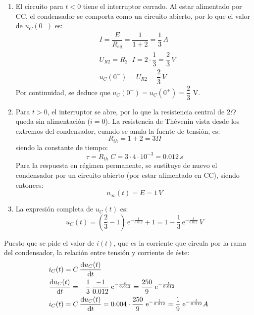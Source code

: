 \begin{enumerate}
    \item El circuito para $t<0$ tiene el interruptor cerrado. Al estar alimentado por CC, el condensador se comporta como un circuito abierto, por lo que el valor de $u_C(0^-)$ es:
    \begin{align*}
        &I=\dfrac{E}{R_{eq}}=\dfrac{1}{1+2}=\dfrac{1}{3}\,A\\
        &U_{R2}=R_2\cdot I=2\cdot\dfrac{1}{3}=\dfrac{2}{3}\,V\\
        &u_C(0^-)=U_{R2}=\dfrac{2}{3}\,V
    \end{align*}
    Por continuidad, se deduce que $u_C(0^-)=u_C(0^+)=\dfrac{2}{3}$ V.
    \item Para $t>0$, el interruptor se abre, por lo que la resistencia central de $2\Omega$ queda sin alimentación ($i=0$). La resistencia de Thévenin vista desde los extremos del condensador, cuando se anula la fuente de tensión, es:
    \begin{equation*}
        R_{th}=1+2=3\Omega
    \end{equation*}
    siendo la constante de tiempo:
    \begin{equation*}
        \tau=R_{th}\;C=3\cdot4\cdot10^{-3}=0.012\,s
    \end{equation*}
    Para la respuesta en régimen permanente, se sustituye de nuevo el condensador por un circuito abierto (por estar alimentado en CC), siendo entonces:
    \begin{equation*}
        u_\infty(t)=E=1\,V
    \end{equation*}
    \item La expresión completa de $u_C(t)$ es:
    \begin{equation*}
        u_C(t)=\left(\dfrac{2}{3}-1 \right)\,\mathrm{e}^{-\frac{t}{0.012}}+1=1-\dfrac{1}{3}\,\mathrm{e}^{-\frac{t}{0.012}}\,V
    \end{equation*}
\end{enumerate}
Puesto que se pide el valor de $i(t)$, que es la corriente que circula por la rama del condensador, la relación entre tensión y corriente de éste:
\begin{align*}
    &i_C(t)=C\,\diff{u_C(t)}{t}\\
    &\diff{u_C(t)}{t}=-\dfrac{1}{3}\,\dfrac{-1}{0.012}\; \mathrm{e}^{-\frac{t}{0.012}}=\dfrac{250}{9}\; \mathrm{e}^{-\frac{t}{0.012}}\\
    & i_C(t)=C\,\diff{u_C(t)}{t}=0.004\cdot \dfrac{250}{9}\; \mathrm{e}^{-\frac{t}{0.012}}=\dfrac{1}{9}\; \mathrm{e}^{-\frac{t}{0.012}} A
\end{align*}

